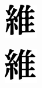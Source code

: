 \documentclass{beamer}
\begin{document}
\begin{frame}
\begin{figure}[htbp]
        \begin{subfigure}[b]{0.1\linewidth}
            \includegraphics[width=\linewidth]{./figures/fonts/642_6.jpg}
            \label{fig:fonts7}
        \end{subfigure}
        \hfill
        \begin{subfigure}[b]{0.1\linewidth}
            \includegraphics[width=\linewidth]{./figures/fonts/642_7.jpg}

\end{subfigure}
\end{figure}
\end{frame}
\end{document}
